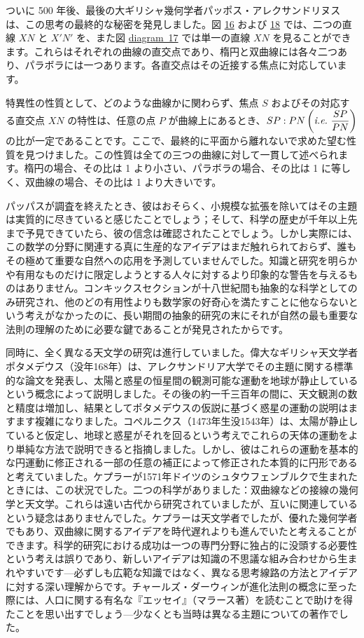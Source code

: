 \documentclass[a4paper,11pt,openany]{ltjsbook}
\providecommand{\FigNum}[1]{\hyperref[fig:#1]{#1}}
\providecommand{\ie}{\emph{i.e.}}
\providecommand{\Fig}[2][Fig.]{\hyperref[fig:#2]{#1~#2}}
\begin{document}
ついに 500 年後、最後の大ギリシャ幾何学者パッポス・アレクサンドリヌスは、この思考の最終的な秘密を発見しました。図 \FigNum{16} および \FigNum{18} では、二つの直線 $XN$ と $X'N'$ を、また図 \Fig[diagram]{17} では単一の直線 $XN$ を見ることができます。これらはそれぞれの曲線の直交点であり、楕円と双曲線には各々二つあり、パラボラには一つあります。各直交点はその近接する焦点に対応しています。

特異性の性質として、どのような曲線かに関わらず、焦点 $S$ およびその対応する直交点 $XN$ の特性は、任意の点 $P$ が曲線上にあるとき、$SP : PN \left( \ie\ \dfrac{SP}{PN} \right)$ の比が一定であることです。ここで、最終的に平面から離れないで求めた望む性質を見つけました。この性質は全ての三つの曲線に対して一貫して述べられます。楕円の場合、その比は 1 より小さい、パラボラの場合、その比は 1 に等しく、双曲線の場合、その比は 1 より大きいです。

パッパスが調査を終えたとき、彼はおそらく、小規模な拡張を除いてはその主題は実質的に尽きていると感じたことでしょう；そして、科学の歴史が千年以上先まで予見できていたら、彼の信念は確認されたことでしょう。しかし実際には、この数学の分野に関連する真に生産的なアイデアはまだ触れられておらず、誰もその極めて重要な自然への応用を予測していませんでした。知識と研究を明らかや有用なものだけに限定しようとする人々に対するより印象的な警告を与えるものはありません。コンキックスセクションが十八世紀間も抽象的な科学としてのみ研究され、他のどの有用性よりも数学家の好奇心を満たすことに他ならないという考えがなかったのに、長い期間の抽象的研究の末にそれが自然の最も重要な法則の理解のために必要な鍵であることが発見されたからです。

同時に、全く異なる天文学の研究は進行していました。偉大なギリシャ天文学者ポタメデウス（没年168年）は、アレクサンドリア大学でその主題に関する標準的な論文を発表し、太陽と惑星の恒星間の観測可能な運動を地球が静止しているという概念によって説明しました。その後の約一千三百年の間に、天文観測の数と精度は増加し、結果としてポタメデウスの仮説に基づく惑星の運動の説明はますます複雑になりました。コペルニクス（1473年生没1543年）は、太陽が静止していると仮定し、地球と惑星がそれを回るという考えでこれらの天体の運動をより単純な方法で説明できると指摘しました。しかし、彼はこれらの運動を基本的な円運動に修正される一部の任意の補正によって修正された本質的に円形であると考えていました。ケプラーが1571年ドイツのシュタウフェンブルクで生まれたときには、この状況でした。二つの科学がありました：双曲線などの接線の幾何学と天文学。これらは遠い古代から研究されていましたが、互いに関連しているという疑念はありませんでした。ケプラーは天文学者でしたが、優れた幾何学者でもあり、双曲線に関するアイデアを時代遅れよりも進んでいたと考えることができます。科学的研究における成功は一つの専門分野に独占的に没頭する必要性という考えは誤りであり、新しいアイデアは知識の不思議な組み合わせから生まれやすいです—必ずしも広範な知識ではなく、異なる思考線路の方法とアイデアに対する深い理解からです。チャールズ・ダーウィンが進化法則の概念に至った際には、人口に関する有名な『エッセイ』（マラース著）を読むことで助けを得たことを思い出すでしょう—少なくとも当時は異なる主題についての著作でした。
\end{document}
